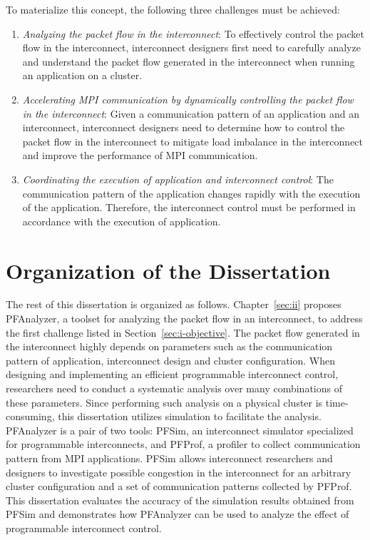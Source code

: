 To materialize this concept, the following three challenges must be achieved:

\begin{enumerate}
\item \emph{Analyzing the packet flow in the interconnect}:
    To effectively control the packet flow in the interconnect, interconnect
    designers first need to carefully analyze and understand the packet flow
    generated in the interconnect when running an application on a cluster.
\item \emph{Accelerating MPI communication by dynamically controlling the
    packet flow in the interconnect}:
    Given a communication pattern of an application and an interconnect,
    interconnect designers need to determine how to control the packet flow in
    the interconnect to mitigate load imbalance in the interconnect and
    improve the performance of MPI communication.
\item \emph{Coordinating the execution of application and interconnect control}:
    The communication pattern of the application changes rapidly with the
    execution of the application. Therefore, the interconnect control must
    be performed in accordance with the execution of application.
\end{enumerate}

\section{Organization of the Dissertation}

The rest of this dissertation is organized as follows.
Chapter~\ref{sec:ii} proposes PFAnalyzer, a toolset for analyzing the
packet flow in an interconnect, to address the first challenge listed in
Section~\ref{sec:i-objective}. The packet flow generated in the interconnect
highly depends on parameters such as the communication pattern of application,
interconnect design and cluster configuration. When designing and implementing
an efficient programmable interconnect control, researchers need to conduct a
systematic analysis over many combinations of these parameters. Since
performing such analysis on a physical cluster is time-consuming, this
dissertation utilizes simulation to facilitate the analysis. PFAnalyzer is a
pair of two tools: PFSim, an interconnect simulator specialized for
programmable interconnects, and PFProf, a profiler to collect communication
pattern from MPI applications. PFSim allows interconnect researchers and
designers to investigate possible congestion in the interconnect for an
arbitrary cluster configuration and a set of communication patterns collected
by PFProf. This dissertation evaluates the accuracy of the simulation results
obtained from PFSim and demonstrates how PFAnalyzer can be used to analyze the
effect of programmable interconnect control.

